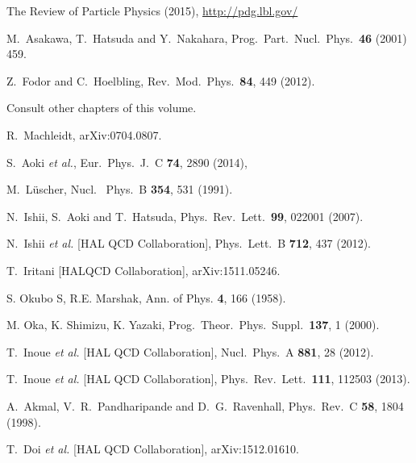 \begin{thebibliography}{99.}
The Review of Particle Physics (2015), \url{http://pdg.lbl.gov/ } 
  
  M.~Asakawa, T.~Hatsuda and Y.~Nakahara,
  Prog.\ Part.\ Nucl.\ Phys.\  {\bf 46} (2001) 459.

  
  Z.~Fodor and C.~Hoelbling, Rev.\ Mod.\ Phys.\  {\bf 84},  449 (2012).
   
Consult other chapters of this volume.
 
  R.~Machleidt, arXiv:0704.0807.

  S.~Aoki {\it et al.},
  Eur.\ Phys.\ J.\ C {\bf 74},  2890 (2014),

 M.~L\"{u}scher, Nucl. \ Phys.\ B {\bf 354},  531 (1991).

N.~Ishii, S.~Aoki and T.~Hatsuda,
Phys.\ Rev.\ Lett.\  {\bf 99},  022001 (2007).

  N.~Ishii {\it et al.} [HAL QCD Collaboration],
 Phys.\ Lett.\ B {\bf 712},  437 (2012).

T.~Iritani [HALQCD Collaboration], arXiv:1511.05246.

S. Okubo S, R.E. Marshak, Ann. of Phys. {\bf 4},  166 (1958).

M. Oka, K. Shimizu, K. Yazaki, Prog.\ Theor.\ Phys.\ Suppl.\  {\bf 137},   1 (2000).  

  T.~Inoue {\it et al.} [HAL QCD Collaboration],
  Nucl.\ Phys.\ A {\bf 881},  28 (2012).
  
  T.~Inoue {\it et al.} [HAL QCD Collaboration],
  Phys.\ Rev.\ Lett.\  {\bf 111},  112503 (2013).
  
  A.~Akmal, V.~R.~Pandharipande and D.~G.~Ravenhall,
  Phys.\ Rev.\ C {\bf 58}, 1804 (1998).
  
  T.~Doi {\it et al.} [HAL QCD Collaboration], arXiv:1512.01610.
 


  
\end{thebibliography}
